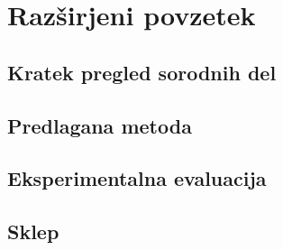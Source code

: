 \chapter{Razširjeni povzetek}

\section{Kratek pregled sorodnih del}

\section{Predlagana metoda}

\section{Eksperimentalna evaluacija}

\section{Sklep}
